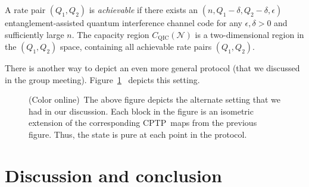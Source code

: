 \documentclass[aps,11pt,twoside,letterpaper]{article}
\begin{document}
		
		A rate pair $(Q_{1},Q_{2})$ is \textit{achievable} if there exists an
		$(n,Q_{1}-\delta,Q_{2}-\delta,\epsilon)$ entanglement-assisted quantum
		interference channel code for any $\epsilon,\delta>0$ and sufficiently large
		$n$. The capacity region $C_{\text{QIC}}(\mathcal{N})$ is a two-dimensional
		region in the $(Q_{1},Q_{2})$ space, containing all achievable rate pairs
		$(Q_{1},Q_{2})$.

		There is another way to depict an even more general protocol (that we
		discussed in the group meeting). Figure~\ref{fig:interference-discussion}%
		\ depicts this setting.%
		\begin{figure}
		[ptb]
		\begin{center}
		\caption{(Color online)\ The above figure depicts the alternate setting that
		we had in our discussion. Each block in the figure is an isometric extension
		of the corresponding CPTP\ maps from the previous figure. Thus, the state is
		pure at each point in the protocol.}%
		\label{fig:interference-discussion}%
		\end{center}
		\end{figure}

		
\section{Discussion and conclusion}
\end{document}
